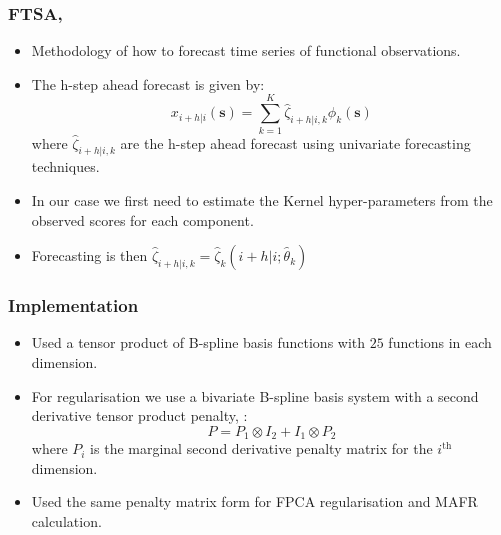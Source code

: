 \documentclass[aspectratio=169]{beamer}
\newcommand{\ve}[1]{\bm{{#1}}}
\begin{document}
  \begin{frame}
    \frametitle{FTSA, \cite{shang_ftsa_2013}}
    \begin{itemize}
      \item Methodology of how to forecast time series of functional observations.
      \item The h-step ahead forecast is given by:
        \begin{equation}
          x_{i+h | i} (\ve{s}) = \sum_{k=1}^{K} \hat{\zeta}_{i+h|i, k} \phi_k(\ve{s})
          \label{eqn:score_for}
        \end{equation}
        where $\hat{\zeta}_{i+h | i, k}$ are the h-step ahead forecast using univariate forecasting techniques. 
      \item In our case we first need to estimate the Kernel hyper-parameters from the observed scores for each component. 
      \item Forecasting is then $\hat{\zeta}_{i+h | i, k} = \hat{\zeta}_k(i+h | i; \hat{\theta}_k)$ 
    \end{itemize}
  \end{frame}

  \begin{frame}
    \frametitle{Implementation}
    \begin{itemize}
      \item Used a tensor product of B-spline basis functions with $25$ functions in each dimension.
      \item For regularisation we use a bivariate B-spline basis system with a second derivative tensor product penalty, \cite{wood_low-rank_2006}:
        \begin{equation}
          P = P_1 \otimes I_2 + I_1 \otimes P_2 
          \label{eqn:reg}
        \end{equation}
        where $P_i$ is the marginal second derivative penalty matrix for the $i^\text{th}$ dimension.
      \item Used the same penalty matrix form for FPCA regularisation and MAFR calculation.   
    \end{itemize}
  \end{frame}
  
\end{document}
